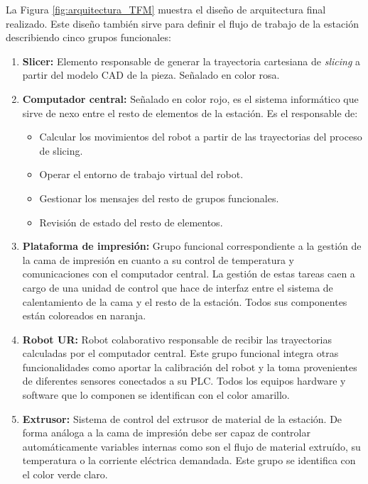 La Figura \ref{fig:arquitectura_TFM} muestra el diseño de arquitectura final realizado. Este diseño también sirve para definir el flujo de trabajo de la estación describiendo cinco grupos funcionales:
\begin{enumerate}
    \item \textbf{Slicer:} Elemento responsable de generar la trayectoria cartesiana de \textit{slicing} a partir del modelo \acrshort{CAD} de la pieza. Señalado en color rosa.
    \item \textbf{Computador central:} Señalado en color rojo, es el sistema informático que sirve de nexo entre el resto de elementos de la estación. Es el responsable de:
    \begin{itemize}
        \item Calcular los movimientos del robot a partir de las trayectorias del proceso de slicing.
        \item Operar el entorno de trabajo virtual del robot.
        \item Gestionar los mensajes del resto de grupos funcionales.
        \item Revisión de estado del resto de elementos.
    \end{itemize}
    \item \textbf{Plataforma de impresión:} Grupo funcional correspondiente a la gestión de la cama de impresión en cuanto a su control de temperatura y comunicaciones con el computador central. La gestión de estas tareas caen a cargo de una unidad de control que hace de interfaz entre el sistema de calentamiento de la cama y el resto de la estación. Todos sus componentes están coloreados en naranja.
    \item \textbf{Robot  UR:} Robot colaborativo responsable de recibir las trayectorias calculadas por el computador central. Este grupo funcional integra otras funcionalidades como aportar la calibración del robot y la toma provenientes de diferentes sensores conectados a su \acrshort{PLC}. Todos los equipos hardware y software que lo componen se identifican con el color amarillo.
    \item \textbf{Extrusor:} Sistema de control del extrusor de material de la estación. De forma análoga a la cama de impresión debe ser capaz de controlar automáticamente variables internas como son el flujo de material extruído, su temperatura o la corriente eléctrica demandada. Este grupo se identifica con el color verde claro.
\end{enumerate}

